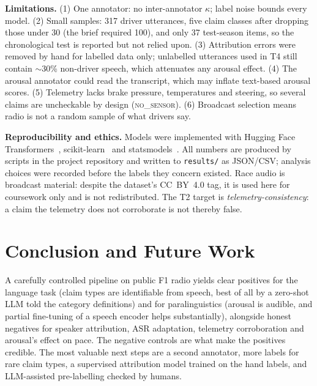 \textbf{Limitations.} (1) One annotator: no inter-annotator $\kappa$; label noise bounds every model. (2) Small samples: 317 driver utterances, five claim classes after dropping those under 30 (the brief required 100), and only 37 test-season items, so the chronological test is reported but not relied upon. (3) Attribution errors were removed by hand for labelled data only; unlabelled utterances used in T4 still contain $\sim$30\% non-driver speech, which attenuates any arousal effect. (4) The arousal annotator could read the transcript, which may inflate text-based arousal scores. (5) Telemetry lacks brake pressure, temperatures and steering, so several claims are uncheckable by design (\textsc{no\_sensor}). (6) Broadcast selection means radio is not a random sample of what drivers say.

\textbf{Reproducibility and ethics.} Models were implemented with Hugging Face Transformers~\cite{wolf2020transformers}, scikit-learn~\cite{pedregosa2011sklearn} and statsmodels~\cite{seabold2010statsmodels}. All numbers are produced by scripts in the project repository and written to \texttt{results/} as JSON/CSV; analysis choices were recorded before the labels they concern existed. Race audio is broadcast material: despite the dataset's CC~BY~4.0 tag, it is used here for coursework only and is not redistributed. The T2 target is \emph{telemetry-consistency}: a claim the telemetry does not corroborate is not thereby false.

\section{Conclusion and Future Work}
A carefully controlled pipeline on public F1 radio yields clear positives for the language task (claim types are identifiable from speech, best of all by a zero-shot LLM told the category definitions) and for paralinguistics (arousal is audible, and partial fine-tuning of a speech encoder helps substantially), alongside honest negatives for speaker attribution, ASR adaptation, telemetry corroboration and arousal's effect on pace. The negative controls are what make the positives credible. The most valuable next steps are a second annotator, more labels for rare claim types, a supervised attribution model trained on the hand labels, and LLM-assisted pre-labelling checked by humans.
